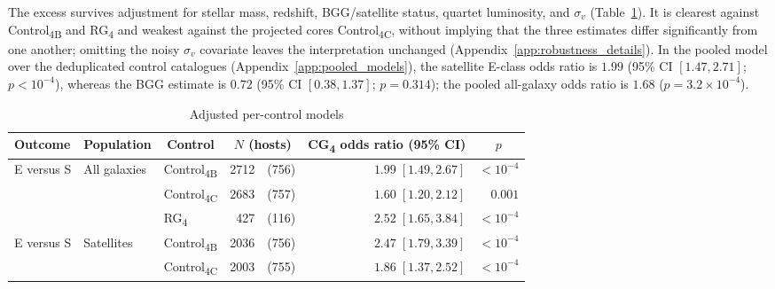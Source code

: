 \documentclass{aa}
\newcommand{\CB}{Control\textsubscript{4B}}
\newcommand{\CC}{Control\textsubscript{4C}}
\newcommand{\CG}{CG\textsubscript{4}}
\newcommand{\RG}{RG\textsubscript{4}}
\begin{document}
The excess survives adjustment for stellar mass, redshift, BGG/satellite status, quartet luminosity, and \(\sigma_v\) (Table~\ref{tab:adjusted_models}). It is clearest against \CB{} and \RG{} and weakest against the projected cores \CC{}, without implying that the three estimates differ significantly from one another; omitting the noisy \(\sigma_v\) covariate leaves the interpretation unchanged (Appendix~\ref{app:robustness_details}).
In the pooled model over the deduplicated control catalogues (Appendix~\ref{app:pooled_models}), the satellite E-class odds ratio is \(1.99\) (95\% CI \([1.47, 2.71]\); \(p<10^{-4}\)), whereas the BGG estimate is \(0.72\) (95\% CI \([0.38, 1.37]\); \(p = 0.314\)); the pooled all-galaxy odds ratio is \(1.68\) (\(p = 3.2\times 10^{-4}\)).


\begin{table}
    \centering
    \caption{Adjusted per-control models}
    \label{tab:adjusted_models}
    \small
    \tabcolsep=3pt
    \begin{tabular}{lllr@{\ }rrr}
    \hline\hline
    Outcome & \multicolumn{1}{c}{Population} & \multicolumn{1}{c}{Control} & \multicolumn{2}{c}{\(N\) (hosts)} & \multicolumn{1}{c}{\CG{} odds ratio (95\% CI)} & \multicolumn{1}{c}{\(p\)} \\
    \hline






    E versus S & All galaxies & \CB{} & 2712 & (756) & \(1.99\;[1.49,2.67]\) & \(<10^{-4}\) \\





     &  & \CC{} & 2683 & (757) & \(1.60\;[1.20,2.12]\) & \(0.001\) \\





     &  & \RG{} & 427 & (116) & \(2.52\;[1.65,3.84]\) & \(<10^{-4}\) \\


    \addlinespace[2pt]





    E versus S & Satellites & \CB{} & 2036 & (756) & \(2.47\;[1.79,3.39]\) & \(<10^{-4}\) \\





     &  & \CC{} & 2003 & (755) & \(1.86\;[1.37,2.52]\) & \(<10^{-4}\) \\






\end{tabular}
\end{table}
\end{document}
